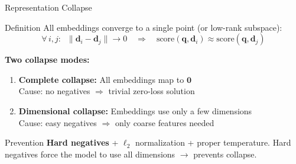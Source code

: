 \documentclass[aspectratio=169]{beamer}
\newif\ifanimated
\newcommand{\cpause}{\ifanimated\pause\fi}
\newcommand{\vq}{\mathbf{q}}
\newcommand{\vd}{\mathbf{d}}
\begin{document}
\begin{frame}{Representation Collapse}
\begin{alertblock}{Definition}
All embeddings converge to a single point (or low-rank subspace):
$$\forall\, i,j: \;\; \|\vd_i - \vd_j\| \to 0 \quad\Rightarrow\quad \text{score}(\vq, \vd_i) \approx \text{score}(\vq, \vd_j)$$
\end{alertblock}

\cpause
\vspace{0.5em}

\textbf{Two collapse modes:}
\begin{enumerate}
    \item \textbf{Complete collapse:} All embeddings map to $\mathbf{0}$\\
    {\small Cause: no negatives $\Rightarrow$ trivial zero-loss solution}

    \item \textbf{Dimensional collapse:} Embeddings use only a few dimensions\\
    {\small Cause: easy negatives $\Rightarrow$ only coarse features needed}
\end{enumerate}

\cpause
\vspace{0.5em}

\begin{exampleblock}{Prevention}
\textbf{Hard negatives} + $\ell_2$ normalization + proper temperature. Hard negatives force the model to use all dimensions $\to$ prevents collapse.
\end{exampleblock}
\end{frame}
\end{document}
